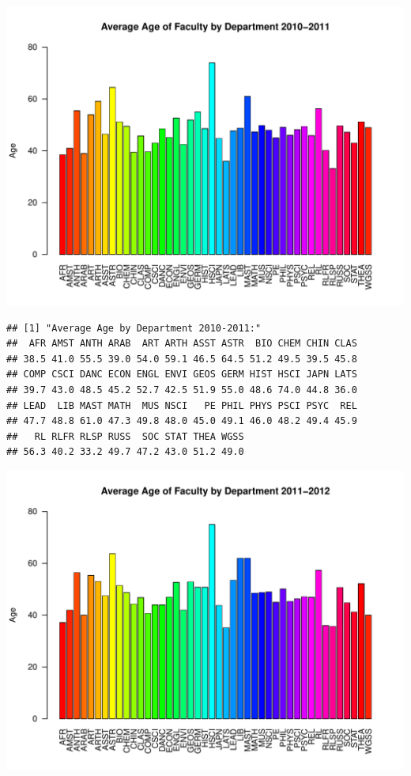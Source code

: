 \documentclass[12pt,a4paper]{article}\usepackage[]{graphicx}\usepackage[]{color}
\makeatletter
\def\maxwidth{ %
  \ifdim\Gin@nat@width>\linewidth
    \linewidth
  \else
    \Gin@nat@width
  \fi
}
\newenvironment{kframe}{%
 \def\at@end@of@kframe{}%
 \ifinner\ifhmode%
  \def\at@end@of@kframe{\end{minipage}}%
  \begin{minipage}{\columnwidth}%
 \fi\fi%
 \def\FrameCommand##1{\hskip\@totalleftmargin \hskip-\fboxsep
 \colorbox{shadecolor}{##1}\hskip-\fboxsep
     \hskip-\linewidth \hskip-\@totalleftmargin \hskip\columnwidth}%
 \MakeFramed {\advance\hsize-\width
   \@totalleftmargin\z@ \linewidth\hsize
   \@setminipage}}%
 {\par\unskip\endMakeFramed%
 \at@end@of@kframe}
\newenvironment{knitrout}{}{} %
\theoremstyle{definition}
\makeatother
\begin{document}
\begin{knitrout}
\includegraphics[width=\maxwidth]{figure/unnamed-chunk-9-7} 
\begin{kframe}\begin{verbatim}
## [1] "Average Age by Department 2010-2011:"
##  AFR AMST ANTH ARAB  ART ARTH ASST ASTR  BIO CHEM CHIN CLAS 
## 38.5 41.0 55.5 39.0 54.0 59.1 46.5 64.5 51.2 49.5 39.5 45.8 
## COMP CSCI DANC ECON ENGL ENVI GEOS GERM HIST HSCI JAPN LATS 
## 39.7 43.0 48.5 45.2 52.7 42.5 51.9 55.0 48.6 74.0 44.8 36.0 
## LEAD  LIB MAST MATH  MUS NSCI   PE PHIL PHYS PSCI PSYC  REL 
## 47.7 48.8 61.0 47.3 49.8 48.0 45.0 49.1 46.0 48.2 49.4 45.9 
##   RL RLFR RLSP RUSS  SOC STAT THEA WGSS 
## 56.3 40.2 33.2 49.7 47.2 43.0 51.2 49.0
\end{verbatim}
\end{kframe}
\includegraphics[width=\maxwidth]{figure/unnamed-chunk-9-8} 

\end{knitrout}
\end{document}

